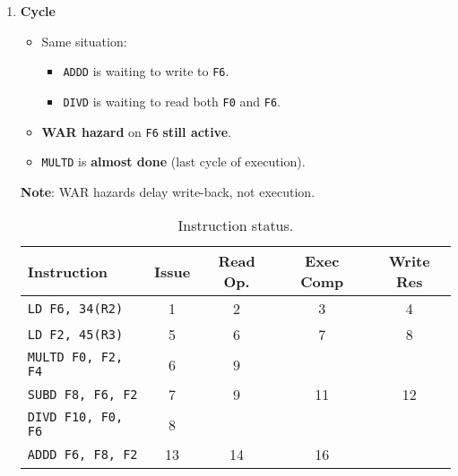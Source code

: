 \begin{enumerate}
    \newpage


    \item \textbf{Cycle \theenumi}
    \begin{itemize}
        \item Same situation:
        \begin{itemize}
            \item \texttt{ADDD} is waiting to write to \texttt{F6}.
            \item \texttt{DIVD} is waiting to read both \texttt{F0} and \texttt{F6}.
        \end{itemize}
        \item[\textcolor{Red2}{\faIcon{exclamation-triangle}}] \textbf{WAR hazard} on \texttt{F6} \textbf{still active}.
        \item \texttt{MULTD} is \textbf{almost done} (last cycle of execution).
    \end{itemize}
    \textbf{Note}: WAR hazards delay write-back, not execution.

    \begin{table}[!htp]
        \centering
        \begin{tabular}{@{} l | c c c c @{}}
            \toprule
            Instruction                 & Issue     & Read Op.  & Exec Comp & Write Res \\
            \midrule
            \texttt{LD    F6, 34(R2)}   & 1         & 2         & 3         & 4         \\ [.3em]
            \texttt{LD    F2, 45(R3)}   & 5         & 6         & 7         & 8         \\ [.3em]
            \texttt{MULTD F0, F2, F4}   & 6         & 9         &           &           \\ [.3em]
            \texttt{SUBD  F8, F6, F2}   & 7         & 9         & 11        & 12        \\ [.3em]
            \texttt{DIVD  F10, F0, F6}  & 8         &           &           &           \\ [.3em]
            \texttt{ADDD  F6, F8, F2}   & 13        & 14        & 16        &           \\
            \bottomrule
        \end{tabular}
        \caption*{Instruction status.}
    \end{table}


\end{enumerate}
